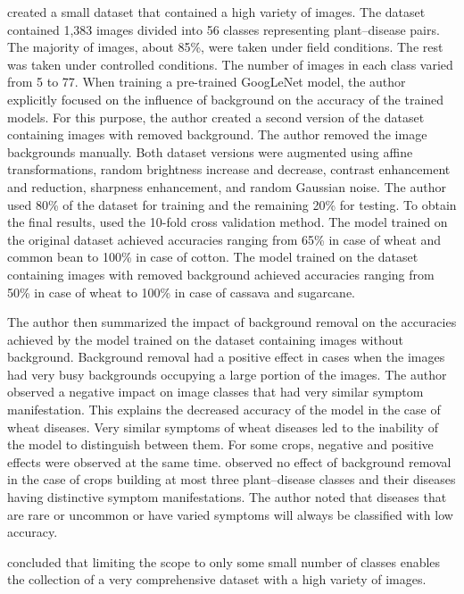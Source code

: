 \documentclass{BachelorBUI}
\begin{document}
        \textcite{Barbedo:2018:1} created a small dataset that contained a high variety of images. The dataset contained 1,383 images divided into 56 classes representing plant--disease pairs. The majority of images, about 85\%, were taken under field conditions. The rest was taken under controlled conditions. The number of images in each class varied from 5 to 77. When training a pre-trained GoogLeNet model, the author explicitly focused on the influence of background on the accuracy of the trained models. For this purpose, the author created a second version of the dataset containing images with removed background. The author removed the image backgrounds manually. Both dataset versions were augmented using affine transformations, random brightness increase and decrease, contrast enhancement and reduction, sharpness enhancement, and random Gaussian noise. The author used 80\% of the dataset for training and the remaining 20\% for testing. To obtain the final results, \textcite{Barbedo:2018:1} used the 10-fold cross validation method. The model trained on the original dataset achieved accuracies ranging from 65\% in case of wheat and common bean to 100\% in case of cotton. The model trained on the dataset containing images with removed background achieved accuracies ranging from 50\% in case of wheat to 100\% in case of cassava and sugarcane.

        The author then summarized the impact of background removal on the accuracies achieved by the model trained on the dataset containing images without background. Background removal had a positive effect in cases when the images had very busy backgrounds occupying a large portion of the images. The author observed a negative impact on image classes that had very similar symptom manifestation. This explains the decreased accuracy of the model in the case of wheat diseases. Very similar symptoms of wheat diseases led to the inability of the model to distinguish between them. For some crops, negative and positive effects were observed at the same time. \textcite{Barbedo:2018:1} observed no effect of background removal in the case of crops building at most three plant--disease classes and their diseases having distinctive symptom manifestations. The author noted that diseases that are rare or uncommon or have varied symptoms will always be classified with low accuracy.

        \textcite{Barbedo:2018:1} concluded that limiting the scope to only some small number of classes enables the collection of a very comprehensive dataset with a high variety of images.
\end{document}
